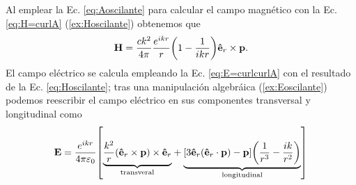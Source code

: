 Al emplear la Ec. \eqref{eq:Aoscilante} para calcular el campo magnético con la Ec. \eqref{eq:H=curlA} (\ref{ex:Hoscilante}) obtenemos que
%
\begin{align}
\vb{H} = \frac{ck^2}{4\pi}\frac{e^{ikr}}{r}\qty(1-\frac{1}{ikr})\vu{e}_r\times\vb{p}.
\label{eq:Hoscilante}
\end{align}
%
El campo eléctrico se calcula empleando la Ec. \eqref{eq:E=curlcurlA} con el resultado de la Ec. \eqref{eq:Hoscilante}; tras una manipulación algebráica (\ref{ex:Eoscilante}) podemos reescribir el campo eléctrico en sus componentes transversal y longitudinal como
%
\begin{align}
\vb{E} = \frac{e^{ikr}}{4\pi\varepsilon_0}\qty[
\mathrlap{\underbrace{\phantom{\frac{k^2}{r}\qty(\vu{e}_r\times\vb{p})\times\vu{e}_r }}_{\text{transveral}}}
\frac{k^2}{r}\qty(\vu{e}_r\times\vb{p})\times\vu{e}_r
+
\mathrlap{\underbrace{\phantom{[3\vu{e}_r\qty(\vu{e}_r\cdot\vb{p})-\vb{p}]\qty(\frac{1}{r^3}-\frac{ik}{r^2})}}_{\text{longitudinal}}}
[3\vu{e}_r\qty(\vu{e}_r\cdot\vb{p})-\vb{p}]\qty(\frac{1}{r^3}-\frac{ik}{r^2})
]
\label{eq:Eoscilante}
\end{align}
%




